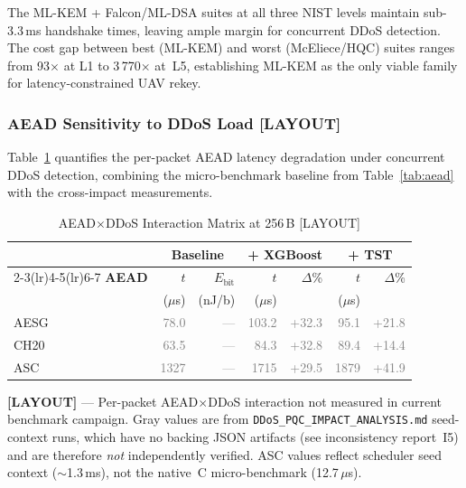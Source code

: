 The ML-KEM + Falcon/ML-DSA suites at all three NIST levels maintain
sub-3.3\,ms handshake times, leaving ample margin for concurrent
DDoS detection.  The cost gap between best (ML-KEM) and worst
(McEliece/HQC) suites ranges from 93$\times$ at L1 to 3\,770$\times$
at~L5, establishing ML-KEM as the only viable family for
latency-constrained UAV rekey.

\subsubsection{AEAD Sensitivity to DDoS Load \textnormal{[LAYOUT]}}
\label{sec:aead_ddos}

Table~\ref{tab:aead_ddos} quantifies the per-packet AEAD latency
degradation under concurrent DDoS detection, combining the micro-benchmark
baseline from Table~\ref{tab:aead} with the cross-impact measurements.

\begin{table}[t]
\centering
\caption{AEAD$\times$DDoS Interaction Matrix at 256\,B [LAYOUT]}
\label{tab:aead_ddos}
\footnotesize
\begin{tabular}{@{}lrrrrrr@{}}
\toprule
 &
  \multicolumn{2}{c}{\textbf{Baseline}} &
  \multicolumn{2}{c}{\textbf{+ XGBoost}} &
  \multicolumn{2}{c}{\textbf{+ TST}} \\
\cmidrule(lr){2-3}\cmidrule(lr){4-5}\cmidrule(lr){6-7}
\textbf{AEAD} &
  $t$ & $E_\text{bit}$ &
  $t$ & $\Delta$\% &
  $t$ & $\Delta$\% \\
& ($\mu$s) & (nJ/b) & ($\mu$s) &  & ($\mu$s) &  \\
\midrule
AESG & \textcolor{gray}{78.0}  & \textcolor{gray}{---} & \textcolor{gray}{103.2} & \textcolor{gray}{+32.3} & \textcolor{gray}{95.1}  & \textcolor{gray}{+21.8} \\
CH20 & \textcolor{gray}{63.5}  & \textcolor{gray}{---} & \textcolor{gray}{84.3}  & \textcolor{gray}{+32.8} & \textcolor{gray}{89.4}  & \textcolor{gray}{+14.4} \\
ASC  & \textcolor{gray}{1327}  & \textcolor{gray}{---} & \textcolor{gray}{1715}  & \textcolor{gray}{+29.5} & \textcolor{gray}{1879}  & \textcolor{gray}{+41.9} \\
\bottomrule
\end{tabular}
\begin{tablenotes}
\footnotesize
\item \textbf{[LAYOUT]} — Per-packet AEAD$\times$DDoS interaction not
  measured in current benchmark campaign.
  Gray values are from \texttt{DDoS\_PQC\_IMPACT\_ANALYSIS.md}
  seed-context runs, which have no backing JSON artifacts
  (see inconsistency report~I5) and are therefore \emph{not}
  independently verified.
  ASC values reflect scheduler seed context ($\sim$1.3\,ms), not
  the native~C micro-benchmark (12.7\,$\mu$s).
\end{tablenotes}
\end{table}

